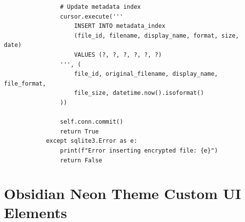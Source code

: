 \documentclass[12pt,a4paper]{report}
\begin{document}
\begin{lstlisting}
                # Update metadata index
                cursor.execute('''
                    INSERT INTO metadata_index 
                    (file_id, filename, display_name, format, size, date)
                    VALUES (?, ?, ?, ?, ?, ?)
                ''', (
                    file_id, original_filename, display_name, file_format,
                    file_size, datetime.now().isoformat()
                ))
                
                self.conn.commit()
                return True
            except sqlite3.Error as e:
                print(f"Error inserting encrypted file: {e}")
                return False
\end{lstlisting}

\section{Obsidian Neon Theme Custom UI Elements}
\end{document}
